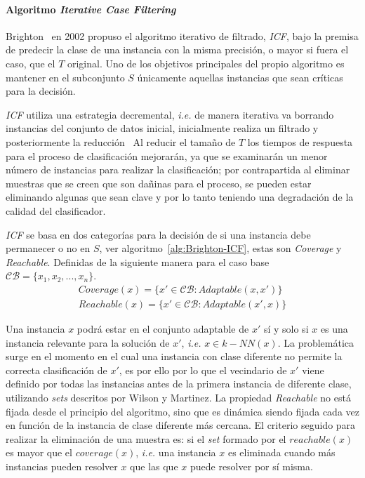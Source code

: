 \paragraph{Algoritmo \textit{Iterative Case Filtering}}\label{subsubsub:ICF}
\hfill \break
Brighton~\cite{brighton2002advances} en 2002 propuso el algoritmo iterativo de filtrado, \textit{ICF}, bajo la premisa de predecir la clase de una instancia con la misma precisión, o mayor si fuera el caso, que el $T$ original. Uno de los objetivos principales del propio algoritmo es mantener en el subconjunto $S$ únicamente aquellas instancias que sean críticas para la decisión.

\textit{ICF} utiliza una estrategia decremental, \textit{i.e.} de manera iterativa va borrando instancias del conjunto de datos inicial, inicialmente realiza un filtrado y posteriormente la reducción~\cite{brighton2002advances} Al reducir el tamaño de $T$ los tiempos de respuesta para el proceso de clasificación mejorarán, ya que se examinarán un menor número de instancias para realizar la clasificación; por contrapartida al eliminar muestras que se creen que son dañinas para el proceso, se pueden estar eliminando algunas que sean clave y por lo tanto teniendo una degradación de la calidad del clasificador.

\textit{ICF} se basa en dos categorías para la decisión de si una instancia debe permanecer o no en $S$, ver algoritmo~\ref{alg:Brighton-ICF}, estas son \textit{Coverage} y \textit{Reachable}. Definidas de la siguiente manera para el caso base $\mathcal{CB} = \lbrace x_1, x_2, ..., x_n\rbrace$.
\begin{align*}
Coverage (x) = \lbrace x' \in \mathcal{CB} : Adaptable(x, x')\rbrace  \\
Reachable (x) = \lbrace x' \in \mathcal{CB} : Adaptable(x',x)\rbrace
\end{align*}

Una instancia $x$ podrá estar en el conjunto adaptable de $x'$ sí y solo si $x$ es una instancia relevante para la solución de $x'$, \textit{i.e.} $x \in k-NN(x)$. La problemática surge en el momento en el cual una instancia con clase diferente no permite la correcta clasificación de $x'$, es por ello por lo que el vecindario de $x'$ viene definido por todas las instancias antes de la primera instancia de diferente clase, utilizando \textit{sets} descritos por Wilson y Martinez. La propiedad \textit{Reachable} no está fijada desde el principio del algoritmo, sino que es dinámica siendo fijada cada vez en función de la instancia de clase diferente más cercana. El criterio seguido para realizar la eliminación de una muestra es: si el \textit{set} formado por el $reachable(x)$ es mayor que el $coverage(x)$, \textit{i.e.} una instancia $x$ es eliminada cuando más instancias pueden resolver $x$ que las que $x$ puede resolver por sí misma.


